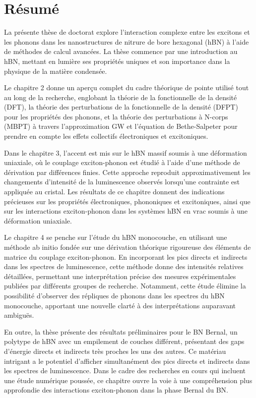 \chapter*{Résumé}

%

%

La présente thèse de doctorat explore l'interaction complexe entre les excitons et les phonons dans les nanostructures de nitrure de bore hexagonal (hBN) à l'aide de méthodes de calcul avancées. La thèse commence par une introduction au hBN, mettant en lumière ses propriétés uniques et son importance dans la physique de la matière condensée. 

Le chapitre 2 donne un aperçu complet du cadre théorique de pointe utilisé tout au long de la recherche, englobant la théorie de la fonctionnelle de la densité (DFT), la théorie des perturbations de la fonctionnelle de la densité (DFPT) pour les propriétés des phonons, et la théorie des perturbations à N-corps (MBPT) à travers l'approximation GW et l'équation de Bethe-Salpeter pour prendre en compte les effets collectifs électroniques et excitoniques.

Dans le chapitre 3, l'accent est mis sur le hBN massif soumis à une déformation uniaxiale, où le couplage exciton-phonon est étudié à l'aide d'une méthode de dérivation par différences finies. Cette approche reproduit approximativement les changements d'intensité de la luminescence observés lorsqu'une contrainte est appliquée au cristal. Les résultats de ce chapitre donnent des indications précieuses sur les propriétés électroniques, phononiques et excitoniques, ainsi que sur les interactions exciton-phonon dans les systèmes hBN en vrac soumis à une déformation uniaxiale.

Le chapitre 4 se penche sur l'étude du hBN monocouche, en utilisant une méthode ab initio fondée sur une dérivation théorique rigoureuse des éléments de matrice du couplage exciton-phonon. En incorporant les pics directs et indirects dans les spectres de luminescence, cette méthode donne des intensités relatives détaillées, permettant une interprétation précise des mesures expérimentales publiées par différents groupes de recherche. Notamment, cette étude élimine la possibilité d'observer des répliques de phonons dans les spectres du hBN monocouche, apportant une nouvelle clarté à des interprétations auparavant ambiguës.

En outre, la thèse présente des résultats préliminaires pour le BN Bernal, un polytype de hBN avec un empilement de couches différent, présentant des gaps d'énergie directs et indirects très proches les uns des autres. Ce matériau intrigant a le potentiel d'afficher simultanément des pics directs et indirects dans les spectres de luminescence. Dans le cadre des recherches en cours qui incluent une étude numérique poussée, ce chapitre ouvre la voie à une compréhension plus approfondie des interactions exciton-phonon dans la phase Bernal du BN.

